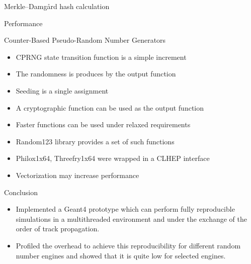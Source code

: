 \documentclass[aspectratio=169, 14pt]{beamer}
\begin{document}
\begin{large}
 \begin{frame}{Merkle–Damgård hash calculation}
  \begin{figure}
   \scalebox{.5}{}
  \end{figure}
 \end{frame}
 
 
 \begin{frame}{Performance}
  \begin{figure}
   \begin{subfloat}[][]
    \centering
    \scalebox{.33}{}  
   \end{subfloat}
   \begin{subfloat}[][]
    \centering
    \scalebox{.33}{}  
    \label{fig:B}
   \end{subfloat}
  \end{figure}
 \end{frame}

 \begin{frame}{Counter-Based Pseudo-Random Number Generators}
  \begin{itemize}
   \item CPRNG state transition function is a simple increment
   \item The randomness is produces by the output function
   \item Seeding is a single assignment
   \item A cryptographic function can be used as the output function
   \item Faster functions can be used under relaxed requirements
   \item Random123 library provides a set of such functions
   \item Philox1x64, Threefry1x64 were wrapped in a CLHEP interface
   \item Vectorization may increase performance
  \end{itemize}

 \end{frame}
 
 
 \begin{frame}{Conclusion}
  \begin{itemize}
   \item Implemented a Geant4 prototype which can perform fully reproducible simulations in a multithreaded environment and under the exchange of the order of track propagation.
   \item Profiled the overhead to achieve this reproducibility for different random number engines and showed that it is quite low for selected engines.
  

\end{itemize}
\end{frame}
\end{large}
\end{document}
